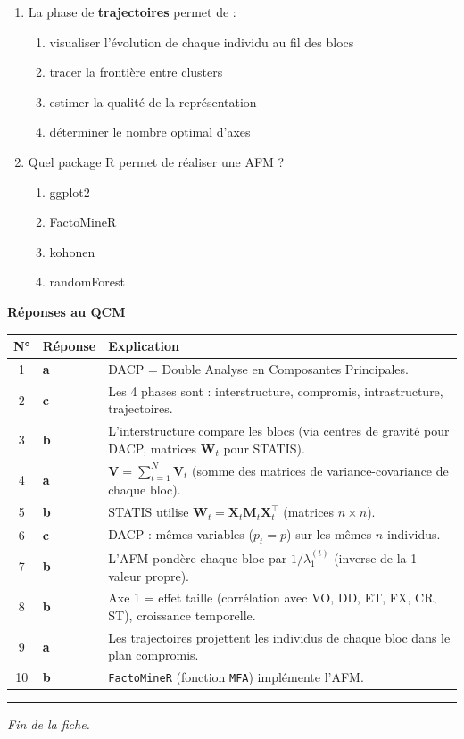 \documentclass[a4paper,11pt]{article}
\begin{document}
\begin{enumerate}
    \item La phase de \textbf{trajectoires} permet de :
    \begin{enumerate}
        \item visualiser l'évolution de chaque individu au fil des blocs
        \item tracer la frontière entre clusters
        \item estimer la qualité de la représentation
        \item déterminer le nombre optimal d'axes
    \end{enumerate}

    \item Quel package R permet de réaliser une AFM ?
    \begin{enumerate}
        \item ggplot2
        \item FactoMineR
        \item kohonen
        \item randomForest
    \end{enumerate}

\end{enumerate}

\newpage
\label{reponses-mb}

\begin{center}
{\Large\textbf{Réponses au QCM}}
\end{center}

\medskip

\begin{tabular}{cp{10cm}}
\toprule
\textbf{N°} & \textbf{Réponse} & \textbf{Explication} \\
 & \textbf{a} & DACP = Double Analyse en Composantes Principales. \\
2 & \textbf{c} & Les 4 phases sont : interstructure, compromis, intrastructure, trajectoires. \\
3 & \textbf{b} & L'interstructure compare les blocs (via centres de gravité pour DACP, matrices $\mathbf{W}_t$ pour STATIS). \\
4 & \textbf{a} & $\mathbf{V} = \sum_{t=1}^N \mathbf{V}_t$ (somme des matrices de variance-covariance de chaque bloc). \\
5 & \textbf{b} & STATIS utilise $\mathbf{W}_t = \mathbf{X}_t \mathbf{M}_t \mathbf{X}_t^\top$ (matrices $n \times n$). \\
6 & \textbf{c} & DACP : mêmes variables ($p_t = p$) sur les mêmes $n$ individus. \\
7 & \textbf{b} & L'AFM pondère chaque bloc par $1/\lambda_1^{(t)}$ (inverse de la 1 valeur propre). \\
8 & \textbf{b} & Axe 1 = effet taille (corrélation avec VO, DD, ET, FX, CR, ST), croissance temporelle. \\
9 & \textbf{a} & Les trajectoires projettent les individus de chaque bloc dans le plan compromis. \\
10 & \textbf{b} & \texttt{FactoMineR} (fonction \texttt{MFA}) implémente l'AFM. \\
\bottomrule
\end{tabular}

\vspace{0.5cm}

\begin{center}
\rule{0.6\textwidth}{0.4pt}
\vspace{0.3cm}
\textit{Fin de la fiche.}
\end{center}
\end{document}
